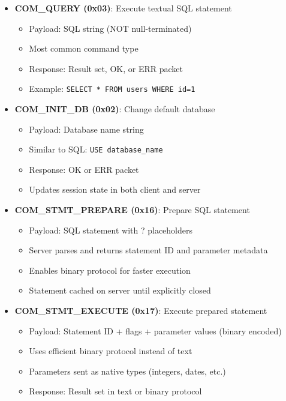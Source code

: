 \begin{itemize}
    \item \textbf{COM\_QUERY (0x03)}: Execute textual SQL statement
    \begin{itemize}
        \item Payload: SQL string (NOT null-terminated)
        \item Most common command type
        \item Response: Result set, OK, or ERR packet
        \item Example: \texttt{SELECT * FROM users WHERE id=1}
    \end{itemize}
    
    \item \textbf{COM\_INIT\_DB (0x02)}: Change default database
    \begin{itemize}
        \item Payload: Database name string
        \item Similar to SQL: \texttt{USE database\_name}
        \item Response: OK or ERR packet
        \item Updates session state in both client and server
    \end{itemize}
    
    \item \textbf{COM\_STMT\_PREPARE (0x16)}: Prepare SQL statement
    \begin{itemize}
        \item Payload: SQL statement with ? placeholders
        \item Server parses and returns statement ID and parameter metadata
        \item Enables binary protocol for faster execution
        \item Statement cached on server until explicitly closed
    \end{itemize}
    
    \item \textbf{COM\_STMT\_EXECUTE (0x17)}: Execute prepared statement
    \begin{itemize}
        \item Payload: Statement ID + flags + parameter values (binary encoded)
        \item Uses efficient binary protocol instead of text
        \item Parameters sent as native types (integers, dates, etc.)
        \item Response: Result set in text or binary protocol
    \end{itemize}
    

\end{itemize}
